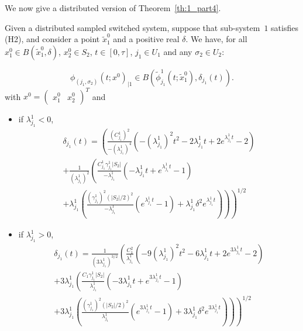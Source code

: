 We now give a distributed version of Theorem~\ref{th:1_part4}.
\begin{theorem}\label{th:1_part4bis}
  Given a distributed sampled switched system, suppose that
  sub-system~$1$ satisfies (H2), and consider a point $\tilde{x}_1^0$
  and a positive real $\delta$.
  We have, for all $x_1^0\in B(\tilde{x}_1^0,\delta)$, $x_2^0 \in
  S_2$, $t\in [0,\tau]$, $j_1\in U_1$ and any $\sigma_2 \in U_2$:

  $$\phi_{(j_1,\sigma_2)}(t;x^0)_{|1}\in B(\tilde{\phi}_{j_ 1}^1(t;\tilde{x}_1^0),\delta_{j_1}(t)).$$
  with $x^0 = \begin{pmatrix}x_1^0 & x_2^0\end{pmatrix}^T$ and
  \begin{itemize}
  \item if $\lambda^1_{j_1} <0$,
    \begin{multline}
      \delta_{j_1} (t) =
      \left( \frac{(C_{j_1}^1)^2}{-(\lambda^1_{j_1})^4} \left( - (\lambda^1_{j_1})^2 t^2 - 2 \lambda^1_{j_1} t + 2 e^{\lambda^1_{j_1} t} - 2 \right) \right.   \\
      + \left. \frac{1}{(\lambda^1_{j_1})^2} \left( \frac{C_{j_1}^1 \gamma^1_{j_1} |S_2|}{-\lambda^1_{j_1}} \left( - \lambda^1_{j_1} t + e^{\lambda^1_{j_1} t} -1 \right) \right. \right.  \\ + \left. \left. \lambda^1_{j_1} \left( \frac{(\gamma^1_{j_1} )^2 (|S_2 |/2)^2}{-\lambda^1_{j_1}} ( e^{\lambda^1_{j_1} t } - 1) + \lambda^1_{j_1} \delta^2 e^{\lambda^1_{j_1} t}  \right) \right)  \right)^{1/2}
    \end{multline}
\item if $\lambda^1_{j_1} >0$,
  \begin{multline}
    \delta_{j_1} (t) = \frac{1}{(3\lambda^1_{j_1})^{3/2}} \left( \frac{C_1^2}{\lambda^1_{j_1}} \left( - 9(\lambda^1_{j_1})^2 t^2 - 6\lambda^1_{j_1} t + 2 e^{3\lambda^1_{j_1} t} - 2 \right) \right.   \\
    + \left. 3\lambda^1_{j_1} \left( \frac{C_1 \gamma^1_{j_1} |S_2|}{\lambda^1_{j_1}} \left( - 3\lambda^1_{j_1} t + e^{3\lambda^1_{j_1} t} -1 \right) \right. \right.  \\
    + \left. \left. 3\lambda^1_{j_1} \left( \frac{(\gamma^1_{j_1}) ^2 (|S_2 |/2)^2}{\lambda^1_{j_1}} ( e^{3\lambda^1_{j_1} t } - 1) + 3\lambda^1_{j_1} \delta^2 e^{3\lambda^1_{j_1} t}  \right) \right)  \right)^{1/2}

\end{multline}
\end{itemize}
\end{theorem}
